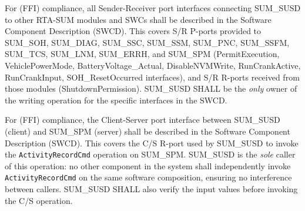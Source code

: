 {}
{                                                                    }


{
For (FFI) compliance, all Sender-Receiver port interfaces connecting SUM\_SUSD to other RTA-SUM modules and SWCs shall be described in the Software Component Description (SWCD). This covers S/R P-ports provided to SUM\_SOH, SUM\_DIAG, SUM\_SSC, SUM\_SSM, SUM\_PNC, SUM\_SSFM, SUM\_TCS, SUM\_LNM, SUM\_ERRH, and SUM\_SPM (PermitExecution, VehiclePowerMode, BatteryVoltage\_Actual, DisableNVMWrite, RunCrankActive, RunCrankInput, SOH\_ResetOccurred interfaces), and S/R R-ports received from those modules (ShutdownPermission).
SUM\_SUSD SHALL be the \textit{only} owner of the writing operation for the specific interfaces in the SWCD.
}
{ }

{
For (FFI) compliance, the Client-Server port interface between SUM\_SUSD (client) and SUM\_SPM (server) shall be described in the Software Component Description (SWCD). This covers the C/S R-port used by SUM\_SUSD to invoke the \texttt{ActivityRecordCmd} operation on SUM\_SPM.
SUM\_SUSD is the \textit{sole} caller of this operation: no other component in the system shall independently invoke \texttt{ActivityRecordCmd} on the same software composition, ensuring no interference between callers. SUM\_SUSD SHALL also verify the input values before invoking the C/S operation.
}
{  }

